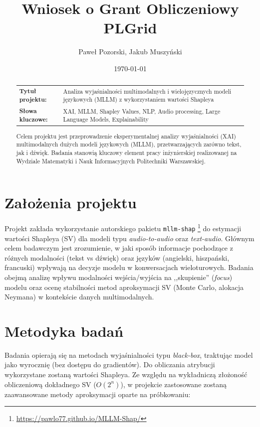 \documentclass[a4paper,11pt]{article}
\title{\textbf{Wniosek o Grant Obliczeniowy PLGrid}}
\author{Paweł Pozorski, Jakub Muszyński}
\date{\today}
\begin{document}
\maketitle
\begin{abstract}
\begin{center}
\begin{tabular}{@{}p{} p{}@{}}
\textbf{Tytuł projektu:} & Analiza wyjaśnialności multimodalnych i wielojęzycznych modeli językowych (MLLM) z wykorzystaniem wartości Shapleya \\[4pt]
\textbf{Słowa kluczowe:} & XAI, MLLM, Shapley Values, NLP, Audio processing, Large Language Models, Explainability
\end{tabular}
\vspace{10pt}

Celem projektu jest przeprowadzenie eksperymentalnej analizy wyjaśnialności (XAI) multimodalnych dużych modeli językowych (MLLM), przetwarzających zarówno tekst, jak i dźwięk. Badania stanowią kluczowy element pracy inżynierskiej realizowanej na Wydziale Matematyki i Nauk Informacyjnych Politechniki Warszawskiej.
\end{center}
\end{abstract}

\section*{Założenia projektu}

Projekt zakłada wykorzystanie autorskiego pakietu \texttt{mllm-shap} \footnote{\url{https://pawlo77.github.io/MLLM-Shap/}} do estymacji wartości Shapleya (SV) dla modeli typu \textit{audio-to-audio} oraz \textit{text-audio}. Głównym celem badawczym jest zrozumienie, w jaki sposób informacje pochodzące z różnych modalności (tekst vs dźwięk) oraz języków (angielski, hiszpański, francuski) wpływają na decyzje modelu w konwersacjach wieloturowych. Badania obejmą analizę wpływu modalności wejścia/wyjścia na ,,skupienie'' (\textit{focus}) modelu oraz ocenę stabilności metod aproksymacji SV (Monte Carlo, alokacja Neymana) w kontekście danych multimodalnych.

\section*{Metodyka badań}

Badania opierają się na metodach wyjaśnialności typu \textit{black-box}, traktując model jako wyrocznię (bez dostępu do gradientów). Do obliczania atrybucji wykorzystane zostaną wartości Shapleya. Ze względu na wykładniczą złożoność obliczeniową dokładnego SV ($O(2^n)$), w projekcie zastosowane zostaną zaawansowane metody aproksymacji oparte na próbkowaniu:
\end{document}
